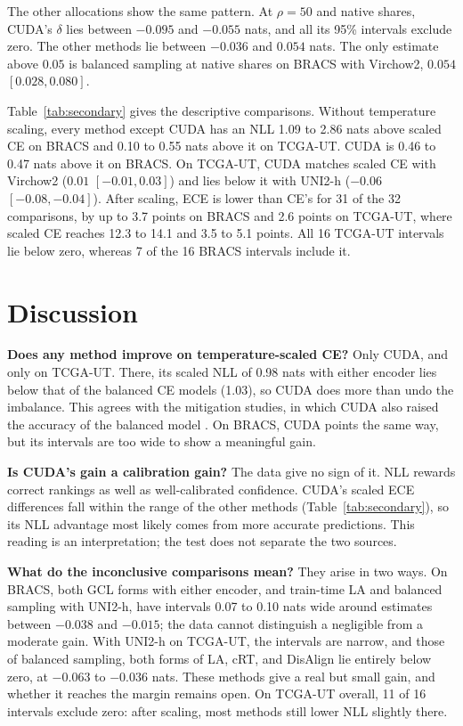\documentclass[11pt]{article}
\begin{document}
The other allocations show the same pattern. At $\rho=50$ and native shares, CUDA's $\delta$ lies between $-0.095$ and $-0.055$ nats, and all its 95\% intervals exclude zero. The other methods lie between $-0.036$ and $0.054$ nats. The only estimate above $0.05$ is balanced sampling at native shares on BRACS with Virchow2, $0.054$ $[0.028, 0.080]$.

Table~\ref{tab:secondary} gives the descriptive comparisons. Without temperature scaling, every method except CUDA has an NLL 1.09 to 2.86 nats above scaled CE on BRACS and 0.10 to 0.55 nats above it on TCGA-UT. CUDA is 0.46 to 0.47 nats above it on BRACS. On TCGA-UT, CUDA matches scaled CE with Virchow2 ($0.01$ $[-0.01, 0.03]$) and lies below it with UNI2-h ($-0.06$ $[-0.08, -0.04]$). After scaling, ECE is lower than CE's for 31 of the 32 comparisons, by up to 3.7 points on BRACS and 2.6 points on TCGA-UT, where scaled CE reaches 12.3 to 14.1 and 3.5 to 5.1 points. All 16 TCGA-UT intervals lie below zero, whereas 7 of the 16 BRACS intervals include it.

\section{Discussion}
\label{sec:discussion}
\textbf{Does any method improve on temperature-scaled CE?} Only CUDA, and only on TCGA-UT. There, its scaled NLL of 0.98 nats with either encoder lies below that of the balanced CE models (1.03), so CUDA does more than undo the imbalance. This agrees with the mitigation studies, in which CUDA also raised the accuracy of the balanced model \citep{queisler2026mitigationTcga}. On BRACS, CUDA points the same way, but its intervals are too wide to show a meaningful gain.

\smallskip\noindent\textbf{Is CUDA's gain a calibration gain?} The data give no sign of it. NLL rewards correct rankings as well as well-calibrated confidence. CUDA's scaled ECE differences fall within the range of the other methods (Table~\ref{tab:secondary}), so its NLL advantage most likely comes from more accurate predictions. This reading is an interpretation; the test does not separate the two sources.

\smallskip\noindent\textbf{What do the inconclusive comparisons mean?} They arise in two ways. On BRACS, both GCL forms with either encoder, and train-time LA and balanced sampling with UNI2-h, have intervals 0.07 to 0.10 nats wide around estimates between $-0.038$ and $-0.015$; the data cannot distinguish a negligible from a moderate gain. With UNI2-h on TCGA-UT, the intervals are narrow, and those of balanced sampling, both forms of LA, cRT, and DisAlign lie entirely below zero, at $-0.063$ to $-0.036$ nats. These methods give a real but small gain, and whether it reaches the margin remains open. On TCGA-UT overall, 11 of 16 intervals exclude zero: after scaling, most methods still lower NLL slightly there.
\end{document}
